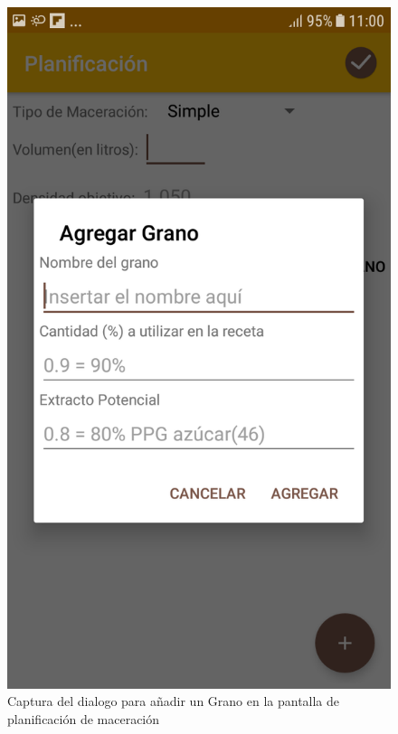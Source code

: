                 \begin{figure}[h]
                    \centering
                    \includegraphics[scale=0.2]{software/ScreenCapture/PlanningActivity-AddGrain.jpg}
                    \caption{Captura del dialogo para añadir un Grano en la pantalla de planificación de maceración}
                    \label{fig:CapturaPlanAddGrain}
                \end{figure}
